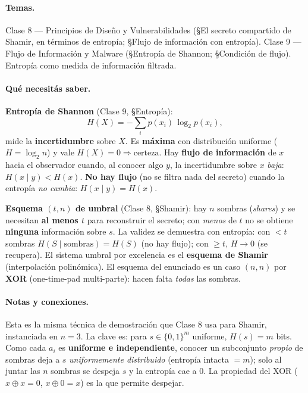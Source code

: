 \paragraph{Temas.}
Clase 8 — Principios de Diseño y Vulnerabilidades (\S El secreto compartido de Shamir, en
términos de entropía; \S Flujo de información con entropía). Clase 9 — Flujo de Información y
Malware (\S Entropía de Shannon; \S Condición de flujo). Entropía como medida de información
filtrada.

\paragraph{Qué necesitás saber.}
\textbf{Entropía de Shannon} (Clase 9, \S Entropía):
\begin{equation*}
H(X) = -\sum_i p(x_i)\,\log_2 p(x_i),
\end{equation*}
mide la \textbf{incertidumbre} sobre $X$. Es \textbf{máxima} con distribución uniforme
($H=\log_2 n$) y vale $\boxed{H(X)=0 \Rightarrow \text{certeza}}$. Hay \textbf{flujo de
información} de $x$ hacia el observador cuando, al conocer algo $y$, la incertidumbre sobre $x$
\emph{baja}: $H(x\mid y) < H(x)$. \textbf{No hay flujo} (no se filtra nada del secreto) cuando la
entropía \emph{no cambia}: $H(x\mid y) = H(x)$.

\textbf{Esquema $(t,n)$ de umbral} (Clase 8, \S Shamir): hay $n$ sombras (\emph{shares}) y se
necesitan \textbf{al menos $t$} para reconstruir el secreto; con \emph{menos} de $t$ no se obtiene
\textbf{ninguna} información sobre $s$. La validez se demuestra con entropía: con $<t$ sombras
$H(S\mid\text{sombras})=H(S)$ (no hay flujo); con $\ge t$, $H\to 0$ (se recupera). El sistema
umbral por excelencia es el \textbf{esquema de Shamir} (interpolación polinómica). El esquema del
enunciado es un caso $(n,n)$ por \textbf{XOR} (one-time-pad multi-parte): hacen falta \emph{todas}
las sombras.

\paragraph{Notas y conexiones.}
Esta es la misma técnica de demostración que Clase 8 usa para Shamir, instanciada en $n=3$. La
clave es: para $s\in\{0,1\}^m$ uniforme, $H(s)=m$ bits. Como cada $a_i$ es \textbf{uniforme e
independiente}, conocer un subconjunto \emph{propio} de sombras deja a $s$ \emph{uniformemente
distribuido} (entropía intacta $=m$); solo al juntar las $n$ sombras se despeja $s$ y la entropía
cae a $0$. La propiedad del XOR ($x\oplus x = 0$, $x\oplus 0 = x$) es la que permite despejar.


